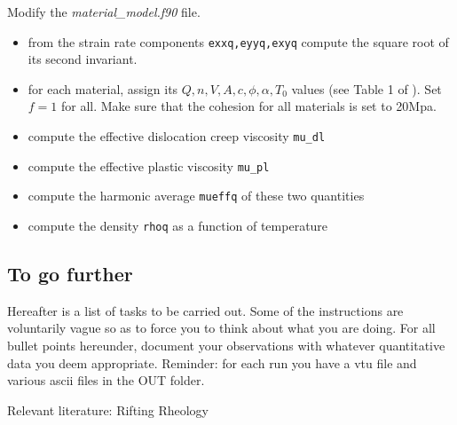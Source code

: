Modify the {\sl material\_model.f90} file.

\begin{itemize}
\item from the strain rate components {\tt exxq,eyyq,exyq} compute the square root of its second invariant.
\item for each material, assign its $Q,n,V,A,c,\phi,\alpha,T_0$ values (see Table 1 of \cite{nabu15}). Set $f=1$ 
for all. Make sure that the cohesion for all materials is set to 20Mpa.
\item compute the effective dislocation creep viscosity {\tt mu\_dl}
\item compute the effective plastic viscosity {\tt mu\_pl}
\item compute the harmonic average {\tt mueffq} of these two quantities 
\item compute the density {\tt rhoq} as a function of temperature  
\end{itemize}


\subsection*{To go further}

Hereafter is a list of tasks to be carried out. Some of the instructions are voluntarily vague so as to 
force you to think about what you are doing. For all bullet points hereunder, document your observations 
with whatever quantitative data you deem appropriate. Reminder: for each run you have a vtu file 
and various ascii files in the OUT folder. 

Relevant literature: 
Rifting \cite{hube03,hubb05,hube07,hube11,bupb09,alht11,alht12,alhf13,engl83,vacl02} 
Rheology \cite{buro11,budr08,hiko03,kawu93}

